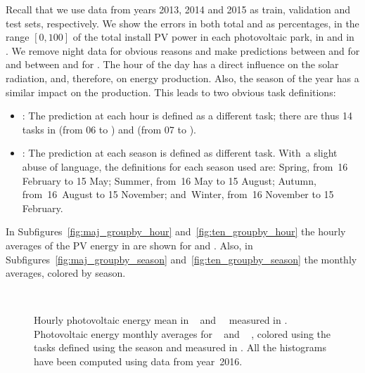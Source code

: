 %
Recall that we use data from years 2013, 2014 and 2015 as train, validation and test sets, respectively.
%
We show the errors in both total \mwhu{} and as percentages, in the range $[0, 100]$ of the total install PV power in each photovoltaic park, {} in  and  in .
%
We remove night data for obvious reasons and make predictions between  and  {for}  and between  and  for .
%
The hour of the day has a direct influence on the solar radiation, and, therefore, on energy production. Also, the season of the year has a similar impact on the production. This leads to two obvious task definitions:
\begin{itemize}
    \item	{}: The prediction at each hour is defined as a different task; there are thus 14 tasks in  (from 06 to ) and  (from 07 to ).
    \item	{}: The prediction at each season is defined as different task.  With~a slight abuse of language, the definitions for each season used are: Spring, from~16 February to 15 May; Summer, from~16 May to 15 August; Autumn, from~16~August to 15 November; and~Winter, from~16 November to 15 February.
\end{itemize}
%
In Subfigures~\ref{fig:maj_groupby_hour} and~\ref{fig:ten_groupby_hour} the hourly averages of the PV energy in \mwhu{} are shown for  and .
Also, in Subfigures~\ref{fig:maj_groupby_season} and~\ref{fig:ten_groupby_season} the monthly averages, colored by season.
\begin{figure}[H]
    \centering%
    \quad%
    \\
    \quad%
 \caption{\label{fig:solar_task_def}Hourly photovoltaic energy mean {in} ~\protect{} {and}~~\protect{} measured in \mwhu{}. Photovoltaic energy monthly averages for ~\protect{} and ~\protect{} , colored using the tasks defined using the season and measured in \mwhu{}. All the histograms have been computed using data from year~2016.}
 \end{figure}
